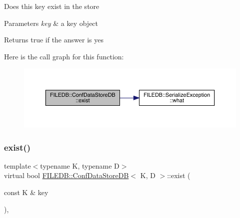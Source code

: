 Does this key exist in the store 
\begin{DoxyParams}{Parameters}
{\em key} & a key object \\
\hline
\end{DoxyParams}
\begin{DoxyReturn}{Returns}
true if the answer is yes 
\end{DoxyReturn}
Here is the call graph for this function\+:
\nopagebreak
\begin{figure}[H]
\begin{center}
\leavevmode
\includegraphics[width=350pt]{d8/d19/classFILEDB_1_1ConfDataStoreDB_afedf2b2ec0b10469cebb72397b02459d_cgraph}
\end{center}
\end{figure}
\mbox{\label{classFILEDB_1_1ConfDataStoreDB_afedf2b2ec0b10469cebb72397b02459d}} 
\subsubsection{\texorpdfstring{exist()}{exist()}\hspace{0.1cm}{\footnotesize\ttfamily [2/3]}}
{\footnotesize\ttfamily template$<$typename K, typename D$>$ \\
virtual bool \mbox{\hyperlink{classFILEDB_1_1ConfDataStoreDB}{F\+I\+L\+E\+D\+B\+::\+Conf\+Data\+Store\+DB}}$<$ K, D $>$\+::exist (\begin{DoxyParamCaption}\item[{const K \&}]{key }\end{DoxyParamCaption})\hspace{0.3cm}{\ttfamily [inline]}, {\ttfamily [virtual]}}


